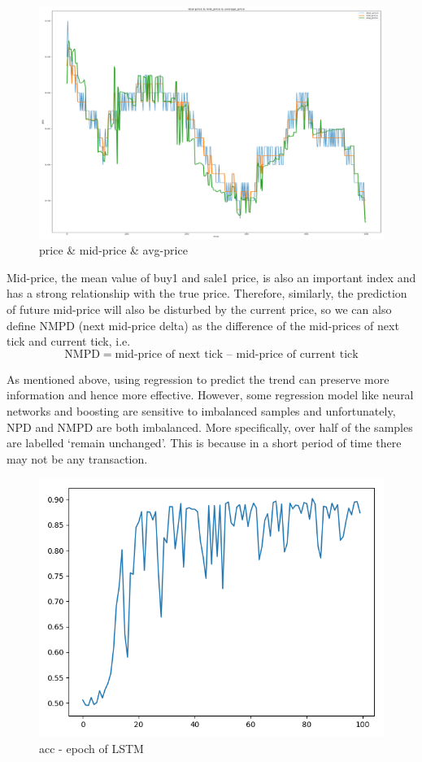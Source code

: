 \documentclass[10pt, conference, compsocconf]{IEEEtran}
\begin{document}
\begin{figure}[ht]
	\centering
	\includegraphics[scale=0.3]{price_mid_avg.png}
	\caption{price \& mid-price \& avg-price} \label{fig 5}
\end{figure}

Mid-price, the mean value of buy1 and sale1 price, is also an important index and has a strong relationship with the true price. Therefore, similarly, the prediction of future mid-price will also be disturbed by the current price, so
we can also define NMPD (next mid-price delta) as the difference of the mid-prices of next tick and current tick, i.e.
$$
	\text{NMPD} = \text{mid-price of next tick } – \text{ mid-price of current tick}
$$

As mentioned above, using regression to predict the trend can preserve more information and hence more effective. However, some regression model like neural networks and boosting are sensitive to imbalanced samples and unfortunately,
NPD and NMPD are both imbalanced. More specifically, over half of the samples are labelled ‘remain unchanged’. This is because in a short period of time there may not be any transaction.\\

\begin{figure}[ht]
	\centering
	\includegraphics[scale=0.3]{lstm_cl_iter_acc.png}
	\caption{acc - epoch of LSTM} \label{fig 5A}
\end{figure}
\end{document}
